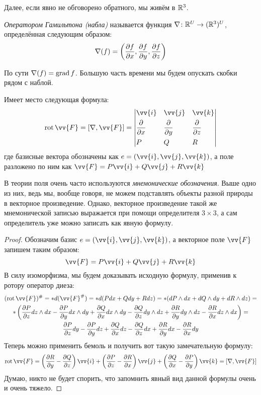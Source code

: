 \begin{note}
	Далее, если явно не обговорено обратного, мы живём в $\mathbb{R}^3$.
\end{note}

\begin{definition}
	\textit{Оператором Гамильтона (набла)} называется функция $\nabla \colon \mathbb{R}^{U} \to (\mathbb{R}^3)^U$, определённая следующим образом:
	\[
		\nabla(f) = \left(\frac{\partial f}{\partial x}, \frac{\partial f}{\partial y}, \frac{\partial f}{\partial z}\right)
	\]
\end{definition}

\begin{note}
	По сути $\nabla(f) = \operatorname{grad} f$. Большую часть времени мы будем опускать скобки рядом с наблой.
\end{note}

\begin{proposition}
	Имеет место следующая формула:
	\[
		\rot \vv{F} = [\nabla, \vv{F}] = \Det{
			&\vv{i}& &\vv{j}& &\vv{k}
			\\
			&\pd{}{x}& &\pd{}{y}& &\pd{}{z}
			\\
			&P& &Q& &R
		}
	\]
	где базисные вектора обозначены как $e = (\vv{i}, \vv{j}, \vv{k})$, а поле разложено по ним как $\vv{F} = P\vv{i} + Q\vv{j} + R\vv{k}$
\end{proposition}

\begin{note}
	В теории поля очень часто используются \textit{мнемонические обозначения}. Выше одно из них, ведь мы, вообще говоря, не можем подставлять объекты разной природы в векторное произведение. Однако, векторное произведение такой же мнемонической записью выражается при помощи определителя $3 \times 3$, а сам определитель уже можно записать как явную формулу.
\end{note}

\begin{proof}
	Обозначим базис $e = (\vv{i}, \vv{j}, \vv{k})$, а векторное поле $\vv{F}$ запишем таким образом:
	\[
		\vv{F} = P\vv{i} + Q\vv{j} + R\vv{k}
	\]
	В силу изоморфизма, мы будем доказывать исходную формулу, применив к ротору оператор диеза:
	\begin{multline*}
		(\rot \vv{F})^\# = *d(\vv{F}^\#) = *d(Pdx + Qdy + Rdz) = *(dP \wedge dx + dQ \wedge dy + dR \wedge dz) =
		\\
		*\ps{\pd{P}{z} dz \wedge dx - \pd{P}{y} dx \wedge dy + \pd{Q}{x} dx \wedge dy - \pd{Q}{z} dy \wedge dz + \pd{R}{y} dy \wedge dz - \pd{R}{x} dz \wedge dx} =
		\\
		\pd{P}{z}dy - \pd{P}{y}dz + \pd{Q}{x}dz - \pd{Q}{z}dx + \pd{R}{y}dx - \pd{R}{x}dy
	\end{multline*}
	Теперь можно применить бемоль и получить вот такую замечательную формулу:
	\[
		\rot \vv{F} = \ps{\pd{R}{y} - \pd{Q}{z}}\vv{i} + \ps{\pd{P}{z} - \pd{R}{x}}\vv{j} + \ps{\pd{Q}{x} - \pd{P}{y}}\vv{k} = [\nabla, \vv{F}]
	\]
	Думаю, никто не будет спорить, что запомнить явный вид данной формулы очень и очень тяжело.
\end{proof}

